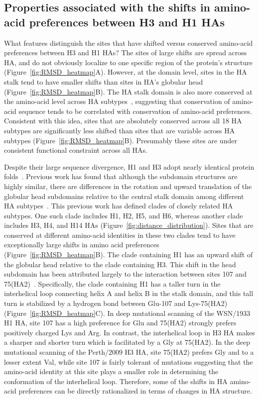 \documentclass[9pt,twocolumn,twoside]{pnas-new}
\begin{document}
\subsection*{Properties associated with the shifts in amino-acid preferences between H3 and H1 HAs}
What features distinguish the sites that have shifted versus conserved amino-acid preferences between H3 and H1 HAs?
The sites of large shifts are spread across HA, and do not obviously localize to one specific region of the protein's structure (Figure~\ref{fig:RMSD_heatmap}A).
However, at the domain level, sites in the HA stalk tend to have smaller shifts than sites in HA's globular head (Figure~\ref{fig:RMSD_heatmap}B). 
The HA stalk domain is also more conserved at the amino-acid level across HA subtypes~\cite{nobusawa1991comparison,hai2012influenza,mallajosyula2014influenza}, suggesting that conservation of amino-acid sequence tends to be correlated with conservation of amino-acid preferences.
Consistent with this idea, sites that are absolutely conserved across all 18 HA subtypes are significantly less shifted than sites that are variable across HA subtypes (Figure~\ref{fig:RMSD_heatmap}B).
Presumably these sites are under consistent functional constraint across all HAs.

Despite their large sequence divergence, H1 and H3 adopt nearly identical protein folds~\cite{ha2002h5,russell2004h1}.
Previous work has found that although the subdomain structures are highly similar, there are differences in the rotation and upward translation of the globular head subdomains relative to the central stalk domain among different HA subtypes~\cite{ha2002h5,russell2004h1}.
This previous work has defined clades of closely related HA subtypes. 
One such clade includes H1, H2, H5, and H6, whereas another clade includes H3, H4, and H14 HAs (Figure~\ref{fig:distance_distribution}).
Sites that are conserved at different amino-acid identities in these two clades tend to have exceptionally large shifts in amino acid preferences (Figure~\ref{fig:RMSD_heatmap}B).
The clade containing H1 has an upward shift of the globular head relative to the clade containing H3.
This shift in the head subdomain has been attributed largely to the interaction between sites 107 and 75(HA2)~\cite{ha2002h5,russell2004h1}.
Specifically, the clade containing H1 has a taller turn in the interhelical loop connecting helix A and helix B in the stalk domain, and this tall turn is stabilized by a hydrogen bond between Glu-107 and Lys-75(HA2) (Figure~\ref{fig:RMSD_heatmap}C).
In deep mutational scanning of the WSN/1933 H1 HA, site 107 has a high preference for Glu and 75(HA2) strongly prefers positively charged Lys and Arg.
In contrast, the interhelical loop in H3 HA makes a sharper and shorter turn which is facilitated by a Gly at 75(HA2).
In the deep mutational scanning of the Perth/2009 H3 HA, site 75(HA2) prefers Gly and to a lesser extent Val, while site 107 is fairly tolerant of mutations suggesting that the amino-acid identity at this site plays a smaller role in determining the conformation of the interhelical loop.
Therefore, some of the shifts in HA amino-acid preferences can be directly rationalized in terms of changes in HA structure.
\end{document}

